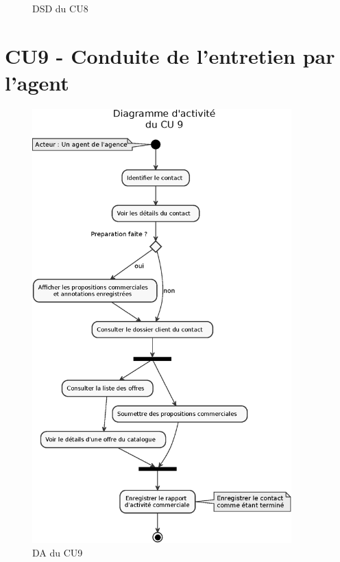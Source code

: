 \begin{figure}[H]
\noindent{}
\caption{DSD du CU8}
\end{figure}

\clearpage
\section{CU9 - Conduite de l’entretien par l’agent}

\begin{figure}[H]
\centering
\includegraphics[width=10cm]{figures/eps/DA_CU9.eps}
\caption{DA du CU9}
\end{figure}

